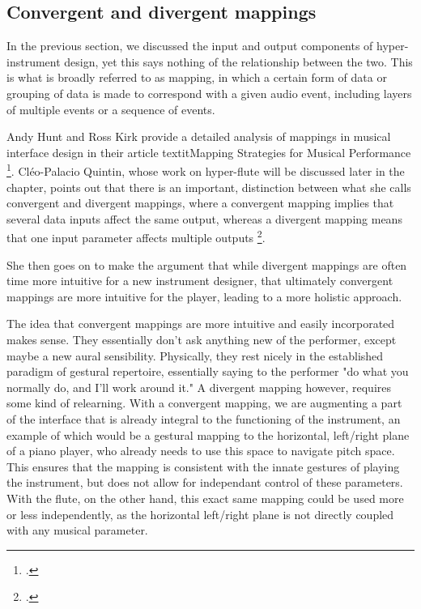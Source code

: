 \documentclass[12pt,twoside,maitrise]{dms_ks}
\theoremstyle{definition}
\begin{document}
\subsection{Convergent and divergent mappings}

In the previous section, we discussed the input and output components of hyper-instrument design, yet this says nothing of the relationship between the two.
This is what is broadly referred to as mapping, in which a certain form of data or grouping of data is made to correspond with a given audio event, including layers of multiple events or a sequence of events. 

Andy Hunt and Ross Kirk provide a detailed analysis of mappings in musical interface design in their article textit{Mapping Strategies for Musical Performance} \footcite{hunt_mapping_2000}.
Cléo-Palacio Quintin, whose work on hyper-flute will be discussed later in the chapter, points out that there is an important, distinction between what she calls convergent and divergent mappings, where a convergent mapping implies that several data inputs affect the same output, whereas a divergent mapping means that one input parameter affects multiple outputs \footcite[44--45]{palacio-quintin_composition_2012-1}. 

She then goes on to make the argument that while divergent mappings are often time more intuitive for a new instrument designer, that ultimately convergent mappings are more intuitive for the player, leading to a more holistic approach. 


The idea that convergent mappings are more intuitive and easily incorporated makes sense. 
They essentially don't ask anything new of the performer, except maybe a new aural sensibility. 
Physically, they rest nicely in the established paradigm of gestural repertoire, essentially saying to the performer "do what you normally do, and I'll work around it." A divergent mapping however, requires some kind of relearning. 
With a convergent mapping, we are augmenting a part of the interface that is already integral to the functioning of the instrument, an example of which would be a gestural mapping to the horizontal, left/right plane of a piano player, who already needs to use this space to navigate pitch space.
This ensures that the mapping is consistent with the innate gestures of playing the instrument, but does not allow for independant control of these parameters.
With the flute, on the other hand, this exact same mapping could be used more or less independently, as the horizontal left/right plane is not directly coupled with any musical parameter.
\end{document}
